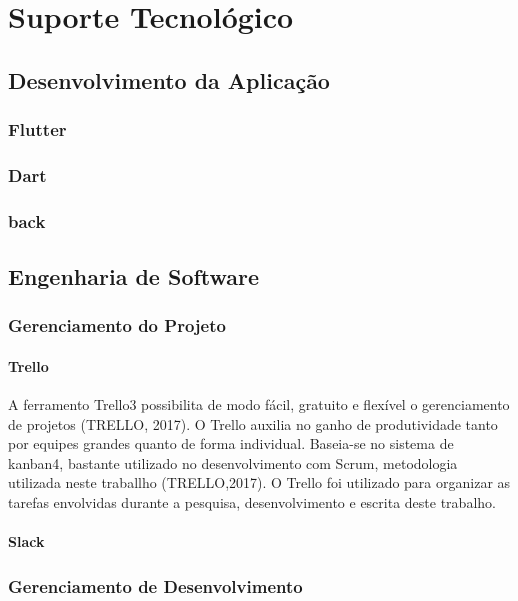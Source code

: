 \chapter[Suporte Tecnológico]{Suporte Tecnológico}

\section{Desenvolvimento da Aplicação}

\subsection{Flutter}

\subsection{Dart}

\subsection{back}

\section{Engenharia de Software}

\subsection{Gerenciamento do Projeto}

\subsubsection{Trello}

A ferramento Trello3 possibilita de modo fácil, gratuito e flexível o gerenciamento de projetos (TRELLO, 2017). O Trello auxilia no ganho de produtividade tanto por equipes grandes quanto de forma individual. Baseia-se no sistema de kanban4, bastante utilizado no desenvolvimento com Scrum, metodologia utilizada neste traballho (TRELLO,2017). O Trello foi utilizado para organizar as tarefas envolvidas durante a pesquisa, desenvolvimento e escrita deste trabalho.

\subsubsection{Slack}

\subsection{Gerenciamento de Desenvolvimento}

